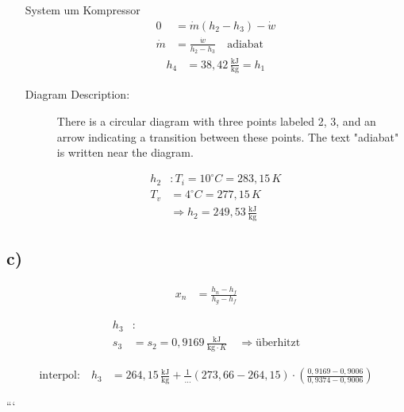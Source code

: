 \begin{itemize}
    \item[System um Kompressor]
    \begin{align*}
        0 &= \dot{m} (h_2 - h_3) - \dot{w} \\
        \dot{m} &= \frac{\dot{w}}{h_2 - h_3} \quad \text{adiabat}
    \end{align*}
    \begin{align*}
        h_4 &= 38,42 \, \frac{\text{kJ}}{\text{kg}} = h_1
    \end{align*}
    \begin{description}
        \item[Diagram Description:] There is a circular diagram with three points labeled 2, 3, and an arrow indicating a transition between these points. The text "adiabat" is written near the diagram.
    \end{description}
    \begin{align*}
        h_2 &: T_i = 10^\circ C = 283,15 \, K \\
        T_v &= 4^\circ C = 277,15 \, K \\
        &\Rightarrow h_2 = 249,53 \, \frac{\text{kJ}}{\text{kg}}
    \end{align*}
\end{itemize}

\subsection*{c)}

\begin{align*}
    x_n &= \frac{h_n - h_f}{h_g - h_f}
\end{align*}

\begin{align*}
    h_3 &: \\
    s_3 &= s_2 = 0,9169 \, \frac{\text{kJ}}{\text{kg} \cdot K} \quad \Rightarrow \text{überhitzt}
\end{align*}

\begin{align*}
    \text{interpol:} \quad h_3 &= 264,15 \, \frac{\text{kJ}}{\text{kg}} + \frac{1}{\ldots} \left( 273,66 - 264,15 \right) \cdot \left( \frac{0,9169 - 0,9006}{0,9374 - 0,9006} \right)
\end{align*}

```
